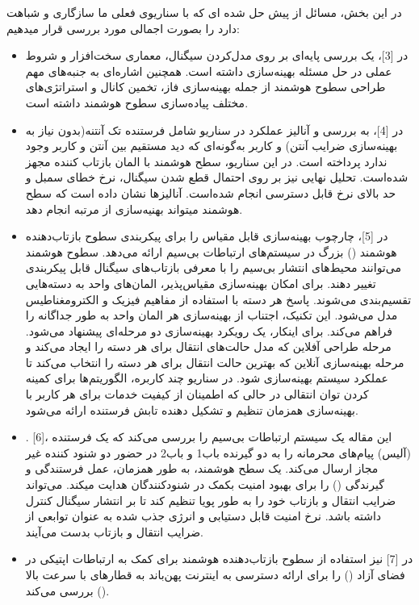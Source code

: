 در این بخش، مسائل از پیش حل شده ای که با سناریوی فعلی ما سازگاری و شباهت دارد را بصورت اجمالی مورد بررسی قرار میدهیم:

\begin{itemize}
	\item 
	در [3]، یک بررسی پایه‌ای بر روی مدل‌کردن سیگنال، معماری سخت‌افزار و شروط عملی در حل مسئله بهینه‌سازی داشته است.
	همچنین اشاره‌ای به جنبه‌های مهم طراحی سطوح هوشمند از جمله بهینه‌سازی فاز، تخمین کانال و استراتژی‌های مختلف پیاده‌سازی سطوح هوشمند داشته است. 
	\item 
	در [4]، به بررسی و آنالیز عملکرد  در سناریو شامل فرستنده تک آنتنه(بدون نیاز به بهینه‌سازی ضرایب آنتن) و کاربر به‌گونه‌ای که دید مستقیم بین آنتن و کاربر وجود ندارد پرداخته است. در این سناریو، سطح هوشمند با  المان بازتاب کننده مجهز شده‌است. تحلیل نهایی نیز بر روی احتمال قطع شدن سیگنال، نرخ خطای سمبل و حد بالای نرخ قابل دسترسی انجام شده‌است. آنالیزها نشان داده‌ است که سطح هوشمند میتواند بهنیه‌سازی از مرتبه  انجام دهد.
	\item 
	در [5]، چارچوب بهینه‌سازی قابل مقیاس را برای پیکربندی سطوح بازتاب‌دهنده هوشمند () بزرگ در سیستم‌های ارتباطات بی‌سیم ارائه می‌دهد. سطوح هوشمند می‌توانند محیط‌های انتشار بی‌سیم را با معرفی بازتاب‌های سیگنال قابل پیکربندی تغییر دهند. برای امکان بهینه‌سازی مقیاس‌پذیر، المان‌های واحد  به دسته‌هایی تقسیم‌بندی می‌شوند. پاسخ هر دسته با استفاده از مفاهیم فیزیک و الکترومغناطیس مدل می‌شود. این تکنیک، اجتناب از بهینه‌سازی هر المان واحد به طور جداگانه را فراهم می‌کند. برای اینکار، یک رویکرد بهینه‌سازی دو مرحله‌ای پیشنهاد می‌شود. مرحله طراحی آفلاین که مدل حالت‌های انتقال برای هر دسته را ایجاد می‌کند و مرحله بهینه‌سازی آنلاین که بهترین حالت انتقال برای هر دسته را انتخاب می‌کند تا عملکرد سیستم بهینه‌سازی شود. در سناریو  چند کاربره، الگوریتم‌ها برای کمینه کردن توان انتقالی در حالی که اطمینان از کیفیت خدمات برای هر کاربر با بهینه‌سازی همزمان تنظیم  و تشکیل دهنده تابش فرستنده ارائه می‌شود.
	\item 
	. [6]، این مقاله یک سیستم ارتباطات بی‌سیم را بررسی می‌کند که یک فرستنده (آلیس) پیام‌های محرمانه را به دو گیرنده باب1 و باب2 در حضور دو شنود کننده غیر مجاز ارسال می‌کند. یک سطح هوشمند، به طور همزمان، عمل فرستندگی و گیرندگی () را برای بهبود امنیت بکمک  در شنودکنندگان هدایت میکند.  می‌تواند ضرایب انتقال و بازتاب خود را به طور پویا تنظیم کند تا بر انتشار سیگنال کنترل داشته باشد. نرخ امنیت قابل دستیابی و انرژی جذب شده به عنوان توابعی از ضرایب انتقال و بازتاب بدست می‌آیند.
	\item 
	در [7] نیز استفاده از سطوح بازتاب‌دهنده هوشمند برای کمک به ارتباطات اپتیکی در فضای آزاد () را برای ارائه دسترسی به اینترنت پهن‌باند به قطارهای با سرعت بالا () بررسی می‌کند.

\end{itemize}
